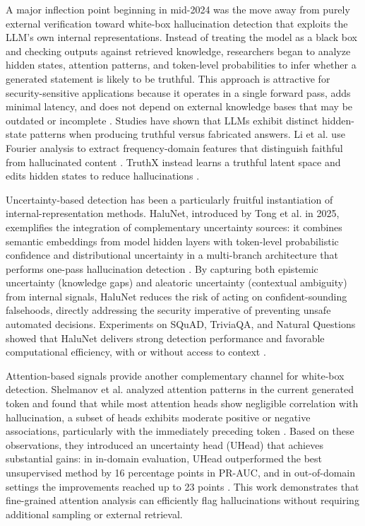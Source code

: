 \documentclass[11pt,a4paper]{article}
\begin{document}
A major inflection point beginning in mid-2024 was the move away from purely external verification toward white-box hallucination detection that exploits the LLM's own internal representations. Instead of treating the model as a black box and checking outputs against retrieved knowledge, researchers began to analyze hidden states, attention patterns, and token-level probabilities to infer whether a generated statement is likely to be truthful. This approach is attractive for security-sensitive applications because it operates in a single forward pass, adds minimal latency, and does not depend on external knowledge bases that may be outdated or incomplete \cite{Tong_2025_LLM_559891bc}. Studies have shown that LLMs exhibit distinct hidden-state patterns when producing truthful versus fabricated answers. Li et al. use Fourier analysis to extract frequency-domain features that distinguish faithful from hallucinated content \cite{Li_2025_LLM_ff8c4a51}. TruthX instead learns a truthful latent space and edits hidden states to reduce hallucinations \cite{Zhang_2024_TruthX}.

Uncertainty-based detection has been a particularly fruitful instantiation of internal-representation methods. HaluNet, introduced by Tong et al. in 2025, exemplifies the integration of complementary uncertainty sources: it combines semantic embeddings from model hidden layers with token-level probabilistic confidence and distributional uncertainty in a multi-branch architecture that performs one-pass hallucination detection \cite{Tong_2025_LLM_559891bc}. By capturing both epistemic uncertainty (knowledge gaps) and aleatoric uncertainty (contextual ambiguity) from internal signals, HaluNet reduces the risk of acting on confident-sounding falsehoods, directly addressing the security imperative of preventing unsafe automated decisions. Experiments on SQuAD, TriviaQA, and Natural Questions showed that HaluNet delivers strong detection performance and favorable computational efficiency, with or without access to context \cite{Tong_2025_LLM_559891bc}.

Attention-based signals provide another complementary channel for white-box detection. Shelmanov et al. analyzed attention patterns in the current generated token and found that while most attention heads show negligible correlation with hallucination, a subset of heads exhibits moderate positive or negative associations, particularly with the immediately preceding token \cite{Shelmanov_2025_LLM_7172d579}. Based on these observations, they introduced an uncertainty head (UHead) that achieves substantial gains: in in-domain evaluation, UHead outperformed the best unsupervised method by 16 percentage points in PR-AUC, and in out-of-domain settings the improvements reached up to 23 points \cite{Shelmanov_2025_LLM_7172d579}. This work demonstrates that fine-grained attention analysis can efficiently flag hallucinations without requiring additional sampling or external retrieval.
\end{document}
